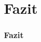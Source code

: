 \footdecorationlow
\section{Fazit}
\begin{frame}[allowframebreaks]
	\thispagestyle{empty}
	\frametitle{Fazit}
	
\end{frame}